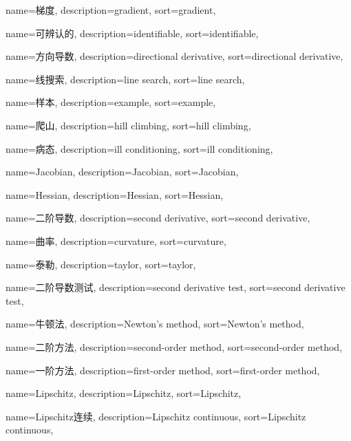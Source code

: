 {
  name=梯度,
  description={gradient},
  sort={gradient},
}

{
	name=可辨认的,
	description={identifiable},
	sort={identifiable},
}

{
  name=方向导数,
  description={directional derivative},
  sort={directional derivative},
}

{
  name=线搜索,
  description={line search},
  sort={line search},
}

{
  name=样本,
  description={example},
  sort={example},
}

{
  name=爬山,
  description={hill climbing},
  sort={hill climbing},
}

{
	name=病态,
	description={ill conditioning},
	sort={ill conditioning},
}


{
  name=Jacobian,
  description={Jacobian},
  sort={Jacobian},
}

{
  name=Hessian,
  description={Hessian},
  sort={Hessian},
}

{
  name=二阶导数,
  description={second derivative},
  sort={second derivative},
}

{
  name=曲率,
  description={curvature},
  sort={curvature},
}

{
  name=泰勒,
  description={taylor},
  sort={taylor},
}

{
  name=二阶导数测试,
  description={second derivative test},
  sort={second derivative test},
}

{
  name=牛顿法,
  description={Newton's method},
  sort={Newton's method},
}

{
	name=二阶方法,
	description={second-order method},
	sort={second-order method},
}

{
	name=一阶方法,
	description={first-order method},
	sort={first-order method},
}

{
  name=Lipschitz,
  description={Lipschitz},
  sort={Lipschitz},
}

{
  name=Lipschitz连续,
  description={Lipschitz continuous},
  sort={Lipschitz continuous},
}

